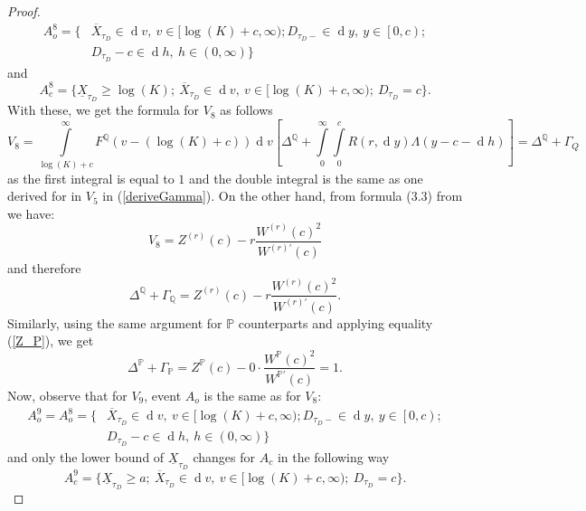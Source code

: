 \documentclass[10pt]{amsart}
\def\P{{\mathbb{P}}}
\def\Q{{\mathbb{Q}}}
\newcommand{\dx}{\operatorname{d}\!}
\def\P{{\mathbb P}} \def\le{\left} \def\ri{\right} \def\i{\infty}
\begin{document}
\begin{proof}
			\begin{align*}
				A_o^8 = \{& \overline{X}_{\tau_D} \in \dx v,\ v \in [\log(K)+c, \infty); D_{\tau_D-} \in \dx y,\ y \in \left[ 0,c \right); \\ \nonumber & D_{\tau_D} - c \in \dx h,\ h \in (0, \infty)
				\}
			\end{align*}
and
			\begin{equation*}
				A_c^8 = \{ \underline{X}_{\tau_D} \geq \log(K);\ \overline{X}_{\tau_D} \in \dx v,\ v \in [\log(K)+c,\infty);\  D_{\tau_D} =c \}.
			\end{equation*}
			With these, we get the formula for $V_8$ as follows
			\begin{equation*}
				V_8 = \int\limits_{\log(K)+c}^{\infty}F^\Q(v-(\log(K)+c))\dx v \left[ \Delta^\Q + \int\limits_{0}^{\infty}\int\limits_{0}^{c} R(r,\dx y) 	\Lambda(y-c-\dx h)  \right] = \Delta^\Q + \Gamma_Q
			\end{equation*}	
			as the first integral is equal to $1$ and the double integral is the same as one derived for in $V_5$ in (\ref{deriveGamma}). On the other hand, from formula (3.3) from \cite{MP} we have:
			\begin{equation*}
				V_8 = Z^{(r)}(c) - r\frac{W^{(r)}(c)^2}{W^{(r)'}(c)}
			\end{equation*}
			and therefore
			\begin{equation}\label{delta_gamma}
				\Delta^\Q + \Gamma_\Q = Z^{(r)}(c) - r\frac{W^{(r)}(c)^2}{W^{(r)'}(c)}.
			\end{equation}		
			Similarly, using the same argument for $\P$ counterparts and applying equality (\ref{Z_P}), we get
			\begin{equation*}
				\Delta^\P + \Gamma_\P = Z^{\P}(c) - 0\cdot\frac{W^{\P}(c)^2}{W^{\P'}(c)} = 1.
			\end{equation*}
			Now, observe that for $V_9$, event $A_o$ is the same as for $V_8$: 
			\begin{align*}
				A_o^9 =  A_o^8 = \{& \overline{X}_{\tau_D} \in \dx v,\ v \in [\log(K)+c, \infty); D_{\tau_D-} \in \dx y,\ y \in \left[ 0,c \right); \\ \nonumber & D_{\tau_D} - c \in \dx h,\ h \in (0, \infty)
				\}
			\end{align*}
and only the lower bound of $\underline{X}_{\tau_D}$ changes for $A_c$ in the following way
			\begin{equation*}
				A_c^9 = \{ \underline{X}_{\tau_D} \geq a;\ \overline{X}_{\tau_D} \in \dx v,\ v \in [\log(K)+c,\infty);\  D_{\tau_D} =c \}.
			\end{equation*}	
			

\end{proof}
\end{document}
